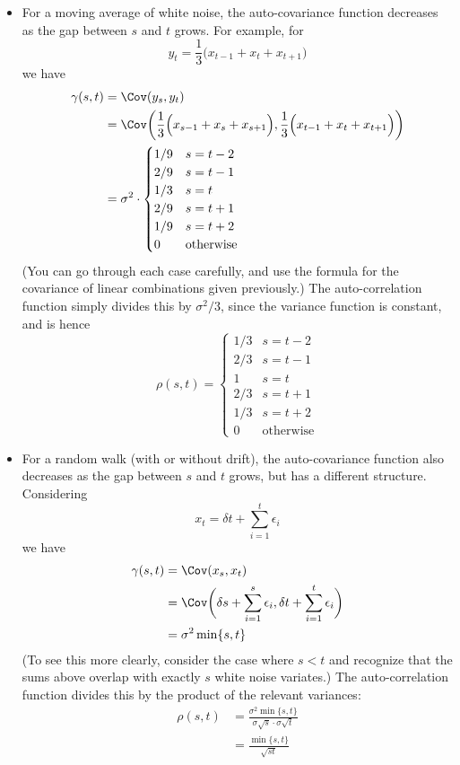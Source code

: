 \documentclass{article}
\begin{document}
\begin{itemize}
\item For a moving average of white noise, the auto-covariance function
  decreases as the gap between $s$ and $t$ grows. For example, for  
  \[
  y_t = \frac{1}{3} \Big( x_{t-1} + x_t + x_{t+1} \Big)
  \]
  we have
  \begin{align*}
  \gamma(s,t) &= \Cov(y_s, y_t) \\
  &= \Cov \bigg( \frac{1}{3} \Big( x_{s-1} + x_s + x_{s+1} \Big), 
    \frac{1}{3} \Big( x_{t-1} + x_t + x_{t+1} \Big) \bigg) \\
  &=  \sigma^2 \cdot 
  \begin{cases}
  1 / 9 & s = t-2 \\
  2 / 9 & s = t-1 \\
  1 / 3 & s = t \\
  2 / 9 & s = t+1 \\
  1 / 9 & s = t+2 \\
  0 & \text{otherwise}
  \end{cases}
  \end{align*}
  (You can go through each case carefully, and use the formula for the
  covariance of linear combinations given previously.) The auto-correlation
  function simply divides this by $\sigma^2 / 3$, since the variance function is 
  constant, and is hence
  \[
  \rho(s,t) = 
  \begin{cases}
  1 / 3 & s = t-2 \\
  2 / 3 & s = t-1 \\
  1 & s = t \\
  2 / 3 & s = t+1 \\
  1 / 3 & s = t+2 \\
  0 & \text{otherwise}
  \end{cases}
  \]

\item For a random walk (with or without drift), the auto-covariance function
  also decreases as the gap between $s$ and $t$ grows, but has a different 
  structure. Considering 
  \[
  x_t = \delta t + \sum_{i=1}^t \epsilon_i
  \]
  we have
  \begin{align*}
  \gamma(s,t) &= \Cov(x_s, x_t) \\
  &= \Cov \bigg( \delta s + \sum_{i=1}^s \epsilon_i, 
  \delta t + \sum_{i=1}^t \epsilon_i \bigg) \\
  &= \sigma^2 \min\{s, t\}
  \end{align*}
  (To see this more clearly, consider the case where $s<t$ and recognize that 
  the sums above overlap with exactly $s$ white noise variates.) The
  auto-correlation function divides this by the product of the relevant
  variances: 
  \begin{align*}
  \rho(s,t) &= \frac{\sigma^2 \min\{s, t\}}{\sigma \sqrt{s} \cdot \sigma 
              \sqrt{t}} \\  
  &= \frac{\min\{s, t\}}{\sqrt{st}}
  \end{align*}


\end{itemize}
\end{document}
